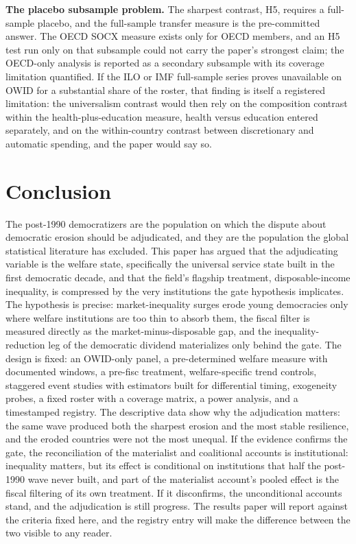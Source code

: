 \documentclass[11pt,letterpaper]{article}
\begin{document}
\textbf{The placebo subsample problem.} The sharpest contrast, H5, requires a full-sample placebo, and the full-sample transfer measure is the pre-committed answer. The OECD SOCX measure exists only for OECD members, and an H5 test run only on that subsample could not carry the paper's strongest claim; the OECD-only analysis is reported as a secondary subsample with its coverage limitation quantified. If the ILO or IMF full-sample series proves unavailable on OWID for a substantial share of the roster, that finding is itself a registered limitation: the universalism contrast would then rely on the composition contrast within the health-plus-education measure, health versus education entered separately, and on the within-country contrast between discretionary and automatic spending, and the paper would say so.

\section{Conclusion}

The post-1990 democratizers are the population on which the dispute about democratic erosion should be adjudicated, and they are the population the global statistical literature has excluded. This paper has argued that the adjudicating variable is the welfare state, specifically the universal service state built in the first democratic decade, and that the field's flagship treatment, disposable-income inequality, is compressed by the very institutions the gate hypothesis implicates. The hypothesis is precise: market-inequality surges erode young democracies only where welfare institutions are too thin to absorb them, the fiscal filter is measured directly as the market-minus-disposable gap, and the inequality-reduction leg of the democratic dividend materializes only behind the gate. The design is fixed: an OWID-only panel, a pre-determined welfare measure with documented windows, a pre-fisc treatment, welfare-specific trend controls, staggered event studies with estimators built for differential timing, exogeneity probes, a fixed roster with a coverage matrix, a power analysis, and a timestamped registry. The descriptive data show why the adjudication matters: the same wave produced both the sharpest erosion and the most stable resilience, and the eroded countries were not the most unequal. If the evidence confirms the gate, the reconciliation of the materialist and coalitional accounts is institutional: inequality matters, but its effect is conditional on institutions that half the post-1990 wave never built, and part of the materialist account's pooled effect is the fiscal filtering of its own treatment. If it disconfirms, the unconditional accounts stand, and the adjudication is still progress. The results paper will report against the criteria fixed here, and the registry entry will make the difference between the two visible to any reader.
\end{document}
